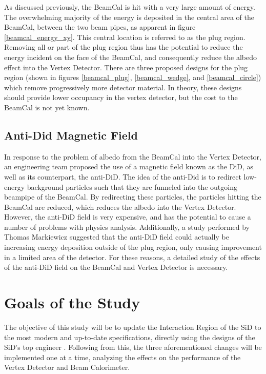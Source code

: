 \documentclass{report}
\begin{document}
                As discussed previously, the BeamCal is hit with a very large amount of energy. The overwhelming majority of the energy is deposited in the central area of the BeamCal, between the two beam pipes, as apparent in figure \ref{beamcal_energy_xy}. This central location is referred to as the plug region. Removing all or part of the plug region thus has the potential to reduce the energy incident on the face of the BeamCal, and consequently reduce the albedo effect into the Vertex Detector. There are three proposed designs for the plug region (shown in figures \ref{beamcal_plug}, \ref{beamcal_wedge}, and \ref{beamcal_circle}) which remove progressively more detector material. In theory, these designs should provide lower occupancy in the vertex detector, but the cost to the BeamCal is not yet known.


            \subsection{Anti-Did Magnetic Field}
                In response to the problem of albedo from the BeamCal into the Vertex Detector, an engineering team proposed the use of a magnetic field known as the DiD, as well as its counterpart, the anti-DiD. The idea of the anti-Did is to redirect low-energy background particles such that they are funneled into the outgoing beampipe of the BeamCal. By redirecting these particles, the particles hitting the BeamCal are reduced, which reduces the albedo into the Vertex Detector. However, the anti-DiD field is very expensive, and has the potential to cause a number of problems with physics analysis. Additionally, a study performed by Thomas Markiewicz \cite{anti-did} suggested that the anti-DiD field could actually be increasing energy deposition outside of the plug region, only causing improvement in a limited area of the detector. For these reasons, a detailed study of the effects of the anti-DiD field on the BeamCal and Vertex Detector is necessary.


        \section{Goals of the Study} %
            The objective of this study will be to update the Interaction Region of the SiD to the most modern and up-to-date specifications, directly using the designs of the SiD's top engineer \cite{excel}. Following from this, the three aforementioned changes will be implemented one at a time, analyzing the effects on the performance of the Vertex Detector and Beam Calorimeter. 
\end{document}
